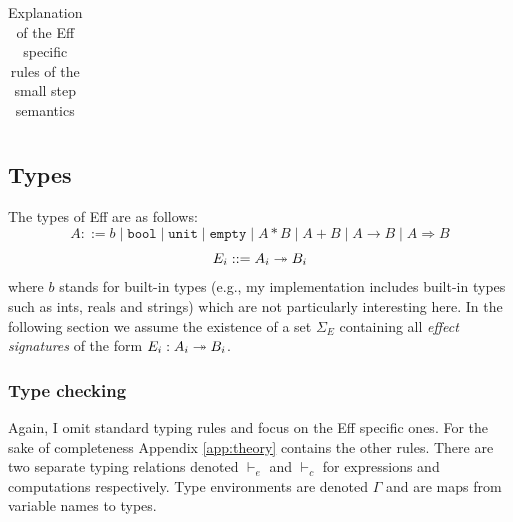 \documentclass[class=article, crop=false]{standalone}
\begin{document}
\begin{table}
{\begin{tabularx}{\textwidth}{lX}
  \bottomrule
  \end{tabularx}
  \caption[Small step operational semantics of Eff]{Explanation of the Eff specific rules of the small step semantics}
  \label{tab:semantics-rule-explanation}
  }
\end{table}

\subsection{Types}

The types of Eff are as follows:
  $$A ::= 
    b \mid
    \mathtt{bool} \mid
    \mathtt{unit} \mid
    \mathtt{empty} \mid
    A * B \mid
    A + B \mid
    A \to B \mid
    A \Rightarrow B$$
  $$ E_i ::= A_i \twoheadrightarrow B_i $$
%
where $b$ stands for built-in types (e.g., my implementation includes built-in
types such as ints, reals and strings) which are not particularly interesting
here. In the following section we assume the existence of a set $\Sigma_E$
containing all \emph{effect signatures} of the form $E_i : A_i \twoheadrightarrow B_i$.

\subsubsection{Type checking}

Again, I omit standard typing rules and focus on the Eff specific ones. For the
sake of completeness Appendix \autoref{app:theory} contains the other rules.
There are two separate typing relations denoted $\vdash_e$ and $\vdash_c$ for
expressions and computations respectively. Type environments are denoted
$\Gamma$ and are maps from variable names to types.
\end{document}
